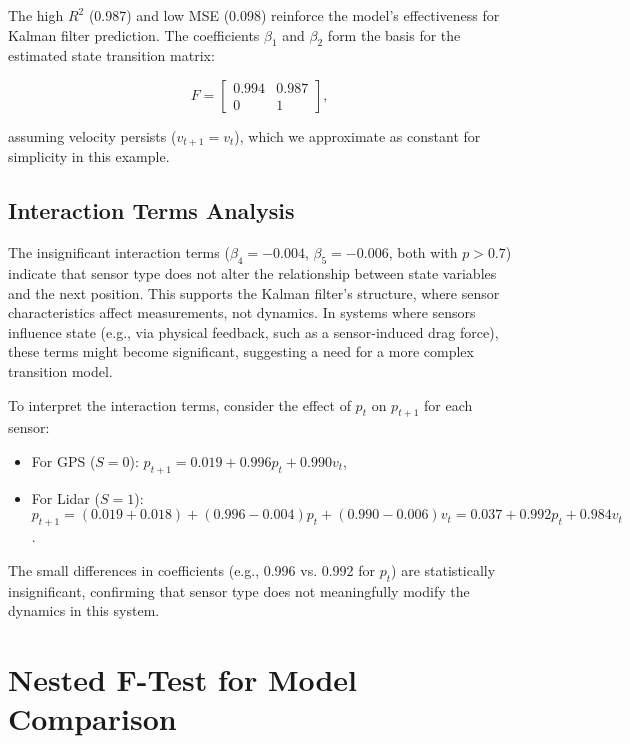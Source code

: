 \documentclass[12pt]{article}
\begin{document}
The high \( R^2 \) (0.987) and low MSE (0.098) reinforce the model’s effectiveness for Kalman filter prediction. The coefficients \( \beta_1 \) and \( \beta_2 \) form the basis for the estimated state transition matrix:

\begin{equation}
    F = \begin{bmatrix} 0.994 & 0.987 \\ 0 & 1 \end{bmatrix},
    \label{eq:estimated_F}
\end{equation}

assuming velocity persists (\( v_{t+1} = v_t \)), which we approximate as constant for simplicity in this example.

\subsection{Interaction Terms Analysis}
\label{subsec:interaction_analysis}

The insignificant interaction terms (\( \beta_4 = -0.004 \), \( \beta_5 = -0.006 \), both with \( p > 0.7 \)) indicate that sensor type does not alter the relationship between state variables and the next position. This supports the Kalman filter’s structure, where sensor characteristics affect measurements, not dynamics. In systems where sensors influence state (e.g., via physical feedback, such as a sensor-induced drag force), these terms might become significant, suggesting a need for a more complex transition model.

To interpret the interaction terms, consider the effect of \( p_t \) on \( p_{t+1} \) for each sensor:
\begin{itemize}
    \item For GPS (\( S = 0 \)): \( p_{t+1} = 0.019 + 0.996 p_t + 0.990 v_t \),
    \item For Lidar (\( S = 1 \)): \( p_{t+1} = (0.019 + 0.018) + (0.996 - 0.004) p_t + (0.990 - 0.006) v_t = 0.037 + 0.992 p_t + 0.984 v_t \).
\end{itemize}

The small differences in coefficients (e.g., 0.996 vs. 0.992 for \( p_t \)) are statistically insignificant, confirming that sensor type does not meaningfully modify the dynamics in this system.

\section{Nested F-Test for Model Comparison}
\label{sec:nested_f_test}
\end{document}
